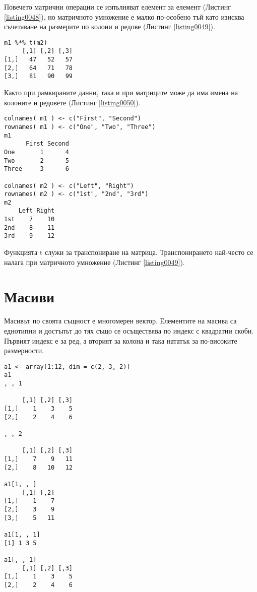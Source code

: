 Повечето матрични операции се изпълняват елемент за елемент (Листинг \ref{listing0048}), но матричното умножение е малко по-особено тъй като изисква съчетаване на размерите по колони и редове (Листинг \ref{listing0049}).

\begin{lstlisting}[caption=Матрично умножение, label=listing0049]
m1 %*% t(m2)
     [,1] [,2] [,3]
[1,]   47   52   57
[2,]   64   71   78
[3,]   81   90   99
\end{lstlisting}

Както при рамкираните данни, така и при матриците може да има имена на колоните и редовете (Листинг \ref{listing0050}).

\begin{lstlisting}[caption=Имена на колоните и редовете, label=listing0050]
colnames( m1 ) <- c("First", "Second")
rownames( m1 ) <- c("One", "Two", "Three")
m1
      First Second
One       1      4
Two       2      5
Three     3      6

colnames( m2 ) <- c("Left", "Right")
rownames( m2 ) <- c("1st", "2nd", "3rd")
m2
    Left Right
1st    7    10
2nd    8    11
3rd    9    12
\end{lstlisting}

Функцията t служи за транспониране на матрица. Транспонирането най-често се налага при матричното умножение (Листинг \ref{listing0049}).

\section{Масиви}

Масивът по своята същност е многомерен вектор. Елементите на масива са еднотипни и достъпът до тях също се осъществява по индекс с квадратни скоби. Първият индекс е за ред, а вторият за колона и така нататък за по-високите размерности.

\begin{lstlisting}[caption=Работа с масиви, label=listing0052]
a1 <- array(1:12, dim = c(2, 3, 2))
a1
, , 1

     [,1] [,2] [,3]
[1,]    1    3    5
[2,]    2    4    6

, , 2

     [,1] [,2] [,3]
[1,]    7    9   11
[2,]    8   10   12

a1[1, , ]
     [,1] [,2]
[1,]    1    7
[2,]    3    9
[3,]    5   11
 
a1[1, , 1]
[1] 1 3 5
 
a1[, , 1]
     [,1] [,2] [,3]
[1,]    1    3    5
[2,]    2    4    6
\end{lstlisting}

